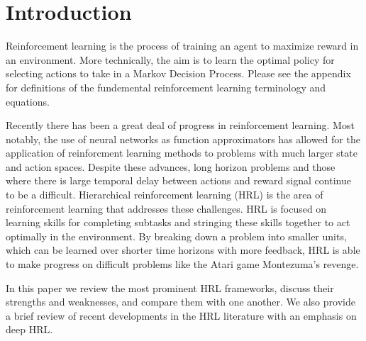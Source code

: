 \section{Introduction}
Reinforcement learning is the process of training an agent to maximize reward in an environment.
More technically, the aim is to learn the optimal policy for selecting actions to take in a Markov Decision Process.
Please see the appendix for definitions of the fundemental reinforcement learning terminology
and equations.

Recently there has been a great deal of progress in reinforcement learning. Most notably,
the use of neural networks as function approximators has allowed for the application of
reinforcment learning methods to problems with much larger state and action spaces.
Despite these advances, long horizon problems  and those where there is large temporal delay between actions and reward signal continue to be a difficult.
Hierarchical reinforcement learning (HRL) is the area of reinforcement learning that addresses these challenges.
HRL is focused on learning skills for completing subtasks and stringing these skills
together to act optimally in the environment. By breaking down a problem into smaller units, which can be learned
over shorter time horizons with more feedback, HRL is able to make progress on difficult
problems like the Atari game Montezuma's revenge.

In this paper we review the most prominent HRL frameworks, discuss their strengths and
weaknesses, and compare them with one another. We also provide a brief review of recent developments in the
HRL literature with an emphasis on deep HRL.

